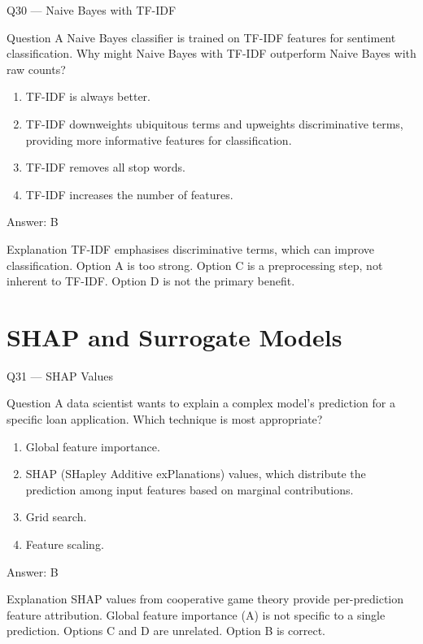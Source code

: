 \documentclass[aspectratio=169,8pt]{beamer}
\begin{document}
	\begin{frame}{Q30 --- Naive Bayes with TF-IDF}
		\begin{block}{Question}
			A Naive Bayes classifier is trained on TF-IDF features for sentiment classification. Why might Naive Bayes with TF-IDF outperform Naive Bayes with raw counts?
			\begin{enumerate}
				\item TF-IDF is always better.
				\item TF-IDF downweights ubiquitous terms and upweights discriminative terms, providing more informative features for classification.
				\item TF-IDF removes all stop words.
				\item TF-IDF increases the number of features.
			\end{enumerate}
		\end{block}
		\begin{exampleblock}{Answer: B}\end{exampleblock}
		\begin{block}{Explanation}
			TF-IDF emphasises discriminative terms, which can improve classification. Option A is too strong. Option C is a preprocessing step, not inherent to TF-IDF. Option D is not the primary benefit.
		\end{block}
	\end{frame}
	
	\section{SHAP and Surrogate Models}
	
	\begin{frame}{Q31 --- SHAP Values}
		\begin{block}{Question}
			A data scientist wants to explain a complex model's prediction for a specific loan application. Which technique is most appropriate?
			\begin{enumerate}
				\item Global feature importance.
				\item SHAP (SHapley Additive exPlanations) values, which distribute the prediction among input features based on marginal contributions.
				\item Grid search.
				\item Feature scaling.
			\end{enumerate}
		\end{block}
		\begin{exampleblock}{Answer: B}\end{exampleblock}
		\begin{block}{Explanation}
			SHAP values from cooperative game theory provide per-prediction feature attribution. Global feature importance (A) is not specific to a single prediction. Options C and D are unrelated. Option B is correct.
		\end{block}
	\end{frame}
	
\end{document}
